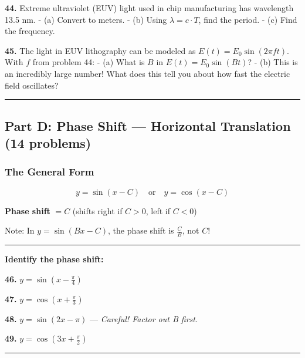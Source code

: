 \documentclass[
  11pt,
]{article}
\begin{document}
\textbf{44.} Extreme ultraviolet (EUV) light used in chip manufacturing
has wavelength 13.5 nm. - (a) Convert to meters. - (b) Using
\(\lambda = c \cdot T\), find the period. - (c) Find the frequency.

\textbf{45.} The light in EUV lithography can be modeled as
\(E(t) = E_0\sin(2\pi f t)\). With \(f\) from problem 44: - (a) What is
\(B\) in \(E(t) = E_0\sin(Bt)\)? - (b) This is an incredibly large
number! What does this tell you about how fast the electric field
oscillates?

\begin{center}\rule{0.5\linewidth}{0.5pt}\end{center}

\hypertarget{part-d-phase-shift-horizontal-translation-14-problems}{%
\subsection{Part D: Phase Shift --- Horizontal Translation (14
problems)}\label{part-d-phase-shift-horizontal-translation-14-problems}}

\hypertarget{the-general-form-2}{%
\subsubsection{The General Form}\label{the-general-form-2}}

\[y = \sin(x - C) \quad \text{or} \quad y = \cos(x - C)\]

\textbf{Phase shift} \(= C\) (shifts right if \(C > 0\), left if
\(C < 0\))

Note: In \(y = \sin(Bx - C)\), the phase shift is \(\frac{C}{B}\), not
\(C\)!

\begin{center}\rule{0.5\linewidth}{0.5pt}\end{center}

\textbf{Identify the phase shift:}

\textbf{46.} \(y = \sin\left(x - \frac{\pi}{4}\right)\)

\textbf{47.} \(y = \cos\left(x + \frac{\pi}{3}\right)\)

\textbf{48.} \(y = \sin(2x - \pi)\) --- \emph{Careful! Factor out B
first.}

\textbf{49.} \(y = \cos\left(3x + \frac{\pi}{2}\right)\)

\begin{center}\rule{0.5\linewidth}{0.5pt}\end{center}
\end{document}
